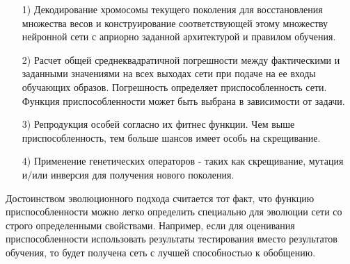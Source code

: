 \begin{enumerate}
  \item[1)] Декодирование хромосомы текущего поколения для восстановления множества весов и конструирование соответствующей этому множеству нейронной сети с априорно заданной архитектурой и правилом обучения.
  \item[2)] Расчет общей среднеквадратичной погрешности между фактическими и заданными значениями на всех выходах сети при подаче на ее входы обучающих образов. Погрешность определяет приспособленность сети. Функция приспособленности может быть выбрана в зависимости от задачи.
  \item[3)] Репродукция особей согласно их фитнес функции. Чем выше приспособленность, тем больше шансов имеет особь на скрещивание.
  \item[4)] Применение генетических операторов - таких как скрещивание, мутация и/или инверсия для получения нового поколения.
\end{enumerate}

Достоинством эволюционного подхода считается тот факт, что функцию приспособленности можно легко определить специально для эволюции сети со строго определенными свойствами. Например, если для оценивания приспособленности использовать результаты тестирования вместо результатов обучения, то будет получена сеть с лучшей способностью к обобщению.